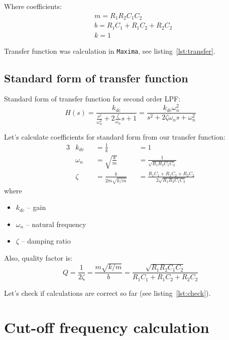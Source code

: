 \documentclass[12pt, a4paper]{article}
\newcommand{\appname}[1]{\texttt{#1}}
\begin{document}
Where coefficients:
\begin{equation*}
\begin{split}
& m = R_1 R_2 C_1 C_2 \\
& b = R_1 C_1 + R_1 C_2 + R_2 C_2 \\
& k = 1
\end{split}
\end{equation*}

Transfer function was calculation in \appname{Maxima}, see
listing~\ref{lst:transfer}.



\subsection{Standard form of transfer function}

Standard form of transfer function for second order LPF:
\[ H(s) = \frac{k_{dc}}{\frac{s^2}{\omega_n^2} + 2 \frac{\zeta}{\omega_n} s + 1}
        = \frac{k_{dc} \omega_n^2}{s^2 + 2 \zeta \omega_n s + \omega_n^2} \]

Let's calculate coefficients for standard form from our transfer function:
\begin{alignat*}{3}
&k_{dc}   &&= \frac{1}{k} &&= 1 \\
&\omega_n &&= \sqrt{\frac{k}{m}} &&= \frac{1}{\sqrt{R_1 R_2 C_1 C_2}} \\
&\zeta    &&= \frac{b}{2 m \sqrt{k / m}}
          &&= \frac{R_1 C_1 + R_1 C_2 + R_2 C_2}{2 \sqrt{R_1 R_2 C_1 C_2}}
\end{alignat*}
where
\begin{itemize}
\item $k_{dc}$ -- gain
\item $\omega_n$ -- natural frequency
\item $\zeta$ -- damping ratio
\end{itemize}

Also, quality factor is:
\[ Q = \frac{1}{2 \zeta} = \frac{m \sqrt{k / m}}{b}
     = \frac{\sqrt{R_1 R_2 C_1 C_2}}{R_1 C_1 + R_1 C_2 + R_2 C_2} \]

Let's check if calculations are correct so far (see listing~\ref{lst:check}).



\section{Cut-off frequency calculation}
\end{document}
